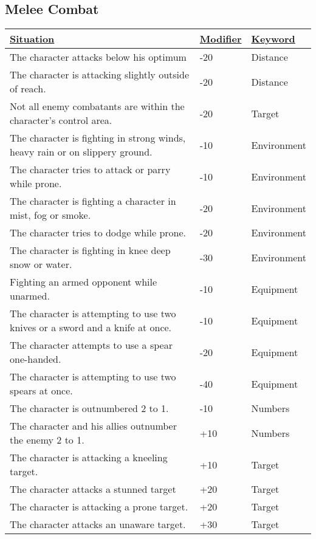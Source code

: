 \subsection{Melee Combat}
\begin{tabularx}{\textwidth}{|X|l|l|}
	\hline
	\ul{Situation} & \ul{Modifier} & \ul{Keyword} \\ \hline
	The character attacks below his optimum & -20 & Distance \\ \hline
	The character is attacking slightly outside of reach. & -20 & Distance \\ \hline
	Not all enemy combatants are within the character's control area. & -20 & Target \\ \hline
	The character is fighting in strong winds, heavy rain or on slippery ground. & -10 & Environment \\ \hline
	The character tries to attack or parry while prone. & -10 & Environment \\ \hline
	The character is fighting a character in mist, fog or smoke. & -20 & Environment \\ \hline
	The character tries to dodge while prone. & -20 & Environment \\ \hline
	The character is fighting in knee deep snow or water. & -30 & Environment \\ \hline
	Fighting an armed opponent while unarmed. & -10 & Equipment \\ \hline
	The character is attempting to use two knives or a sword and a knife at once. & -10 & Equipment \\ \hline
	The character attempts to use a spear one-handed. & -20 & Equipment \\ \hline
	The character is attempting to use two spears at once. & -40 & Equipment \\ \hline
	The character is outnumbered 2 to 1. & -10 & Numbers \\ \hline
	The character and his allies outnumber the enemy 2 to 1. & +10 & Numbers \\ \hline
	The character is attacking a kneeling target. & +10 & Target \\ \hline
	The character attacks a stunned target & +20 & Target \\ \hline
	The character is attacking a prone target. & +20 & Target \\ \hline
	The character attacks an unaware target. & +30 & Target \\ \hline
\end{tabularx}
